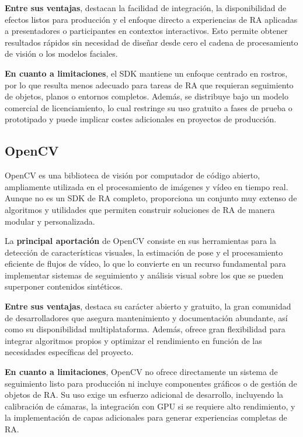\textbf{Entre sus ventajas}, destacan la facilidad de integración, la disponibilidad de efectos listos para producción y el enfoque directo a experiencias de RA aplicadas a presentadores o participantes en contextos interactivos. Esto permite obtener resultados rápidos sin necesidad de diseñar desde cero el cadena de procesamiento de visión o los modelos faciales.

\textbf{En cuanto a limitaciones}, el SDK mantiene un enfoque centrado en rostros, por lo que resulta menos adecuado para tareas de RA que requieran seguimiento de objetos, planos o entornos completos. Además, se distribuye bajo un modelo comercial de licenciamiento, lo cual restringe su uso gratuito a fases de prueba o prototipado y puede implicar costes adicionales en proyectos de producción.
\subsection{OpenCV}
\label{subsec:opencv}
OpenCV \citep{OpenCV} es una biblioteca de visión por computador de código abierto, ampliamente utilizada en el procesamiento de imágenes y vídeo en tiempo real. Aunque no es un SDK de RA completo, proporciona un conjunto muy extenso de algoritmos y utilidades que permiten construir soluciones de RA de manera modular y personalizada.

La \textbf{principal aportación} de OpenCV consiste en sus herramientas para la detección de características visuales, la estimación de pose y el procesamiento eficiente de flujos de vídeo, lo que lo convierte en un recurso fundamental para implementar sistemas de seguimiento y análisis visual sobre los que se pueden superponer contenidos sintéticos.

\textbf{Entre sus ventajas}, destaca su carácter abierto y gratuito, la gran comunidad de desarrolladores que asegura mantenimiento y documentación abundante, así como su disponibilidad multiplataforma. Además, ofrece gran flexibilidad para integrar algoritmos propios y optimizar el rendimiento en función de las necesidades específicas del proyecto.

\textbf{En cuanto a limitaciones}, OpenCV no ofrece directamente un sistema de seguimiento listo para producción ni incluye componentes gráficos o de gestión de objetos de RA. Su uso exige un esfuerzo adicional de desarrollo, incluyendo la calibración de cámaras, la integración con GPU si se requiere alto rendimiento, y la implementación de capas adicionales para generar experiencias completas de RA.

